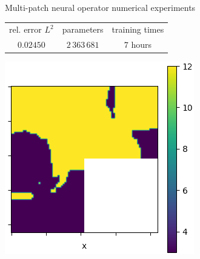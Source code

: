 \documentclass{beamer}
\begin{document}

\begin{frame}{Multi-patch neural operator numerical experiments}
	\begin{table}[h!] %
		\centering
		\begin{tabular}{ccc}\toprule
		rel. error $ L^2 $ & parameters & training times\\
			\cmidrule{1-3}
			$ 0.02450 $ & $ 2\, 363\, 681 $ & $ 7 $ hours\\
			\bottomrule
		\end{tabular}
	\end{table}
	\begin{center}
        \begin{minipage}{0.24\textwidth}
            \includegraphics[width=\textwidth]{MPNO_input.png}
        \end{minipage}
        \hfill
        \begin{minipage}{0.24\textwidth}

\end{minipage}
\end{center}
\end{frame}
\end{document}
